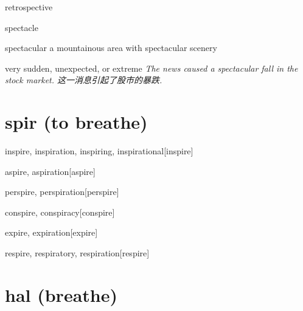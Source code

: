 \begin{RefWord}{retrospective}
\end{RefWord}

\begin{RefWord}{spectacle}
\end{RefWord}

\begin{RefWord}{spectacular}
    a mountainous area with spectacular scenery

    very sudden, unexpected, or extreme
    \textit{The news caused a spectacular fall in the stock market. 这一消息引起了股市的暴跌. }
\end{RefWord}


















\section{spir (to breathe)}





\begin{RefWord}{inspire, inspiration, inspiring, inspirational}[inspire]
\end{RefWord}

\begin{RefWord}{aspire, aspiration}[aspire]
\end{RefWord}

\begin{RefWord}{perspire, perspiration}[perspire]
\end{RefWord}

\begin{RefWord}{conspire, conspiracy}[conspire]
\end{RefWord}

\begin{RefWord}{expire, expiration}[expire]
\end{RefWord}

\begin{RefWord}{respire, respiratory, respiration}[respire]
\end{RefWord}


\section{hal (breathe)}

